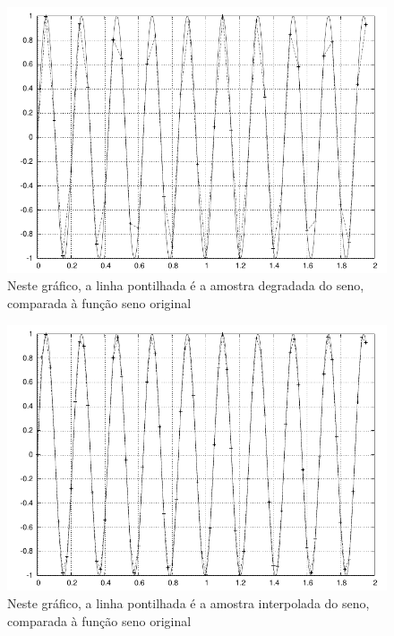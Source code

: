 \begin{figure}[h]
\begin{center}
\leavevmode
\includegraphics[scale=1]{../img/seno-normal.pdf} 
\caption{Neste gráfico, a linha pontilhada é a amostra degradada do seno, comparada à função seno original}
\end{center}
\end{figure}


\begin{figure}[h]
\begin{center}
\leavevmode
\includegraphics[scale=1]{../img/seno-interp.pdf} 
\caption{Neste gráfico, a linha pontilhada é a amostra interpolada do seno, comparada à função seno original}
\end{center}
\end{figure}

